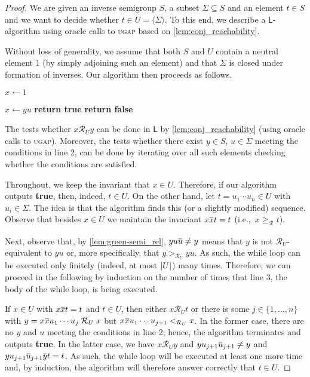 \documentclass[anonymous,letter,UKenglish,cleveref,autoref,thm-restate]{lipics-v2021}
\renewcommand{\geq}{\geqslant}
\newcommand{\ie}{i.e.,~}
\newcommand{\sse}{\subseteq}
\newcommand{\abs}[1] {\ensuremath\left|#1\right|}
\newcommand{\gen}[1]{\langle #1 \rangle}
\newcommand{\LOGSPACE}{\ensuremath{\mathsf{L}}\xspace}
\newcommand*{\gR}[1][]{\mathrel{\mathcal{R}_{#1}}}
\newcommand*{\gRlt}[1][]{<_{\mathcal{R}_{#1}}}
\newcommand*{\gRge}[1][]{\geq_{\mathcal{R}_{#1}}}
\newcommand*{\gRgt}[1][]{>_{\mathcal{R}_{#1}}}
\newcommand\nindent{.5pt}
\newcommand\noverline[1]{\kern\nindent\overline{\kern-\nindent#1\kern-\nindent}\kern\nindent}
\newcommand{\ov}[1]{\noverline{#1}}
\theoremstyle{plain}
\theoremstyle{plain}
\newcommand{\prob}[1]{\textup{\textsc{#1}}\xspace}
\newcommand{\dUGAP}{\prob{ugap}}
\begin{document}
\begin{proof}
	We are given an inverse semigroup $S$, a subset $\Sigma \sse S$ and an element $t \in S$ and we want to decide whether $t \in U = \gen{\Sigma}$.
	To this end, we describe a $\LOGSPACE$-algorithm using oracle calls to \dUGAP based on \cref{lem:conj_reachability}.

  Without loss of generality, we assume that both $S$ and $U$ contain a neutral element $1$ (by simply adjoining such an element) and that $\Sigma$ is closed under formation of inverses.
	Our algorithm then proceeds as follows.	
  \begin{samepage}
  	\begin{algorithmic}[1]
  		\State $x \gets 1$
  		
  		\While{$\exists y \in S$, $u \in \Sigma$ \textbf{with} $x \gR[U] y$ \textbf{and} $yu \ov u \neq y$ \textbf{and} $yu\ov u \ov y\, t = t$}
  		\State 	$x \gets yu$
  			\EndWhile
  		\If{$x \gR[U] t$}
  			\State \textbf{return true}
  		\EndIf
  		\State \textbf{return false}  	
  	\end{algorithmic}
  \end{samepage}

	The tests whether $x \gR[U] y$ can be done in \LOGSPACE by \cref{lem:conj_reachability} (using oracle calls to \dUGAP).
	Moreover, the tests whether there exist $y \in S$, $u \in \Sigma$ meeting the conditions in line 2, can be done by iterating over all such elements checking whether the conditions are satisfied.


	Throughout, we keep the invariant that $x\in U$.
	Therefore, if our algorithm outputs \textbf{true}, then, indeed, $t \in U$.
	On the other hand, let $t = u_1 \cdots u_n \in U$ with $u_i \in \Sigma$.
	The idea is that the algorithm finds this (or a slightly modified) sequence.
    Observe that besides $x \in U$ we maintain the invariant $x \ov x t = t$ (\ie $x \gRge t$).
	
	
  Next, observe that, by \cref{lem:green-semi_rel}, $yu \ov u \neq y$ means that $y$ is not $\gR[U]$-equivalent to $yu$ or, more specifically, that $y \gRgt[U] yu$.
	As such, the while loop can be executed only finitely (indeed, at most $\abs{U}$) many times.
	Therefore, we can proceed in the following by induction on the number of times that line 3, the body of the while loop, is being executed.
	
	If $x \in U$ with $x \ov x t = t$ and $t \in U$, then either $x \gR[U] t$ or there is some $j \in \{1, \dots, n\}$ with $y = x \ov x  u_1\cdots u_j  \gR[U] x$ but $x \ov x  u_1\cdots u_{j+1}  \gRlt[U] x$. 
  	In the former case, there are no $y$ and $u$ meeting the conditions in line 2; hence, the algorithm terminates and outputs \textbf{true}.
	In the latter case, we have $x \gR[U] y$ and $yu_{j+1} \ov u_{j+1} \neq y$ and $y u_{j+1} \ov u_{j+1}  \ov y t = t$.
	As such, the while loop will be executed at least one more time and, by induction, the algorithm will therefore answer correctly that $t \in U$.
\end{proof}
\end{document}
